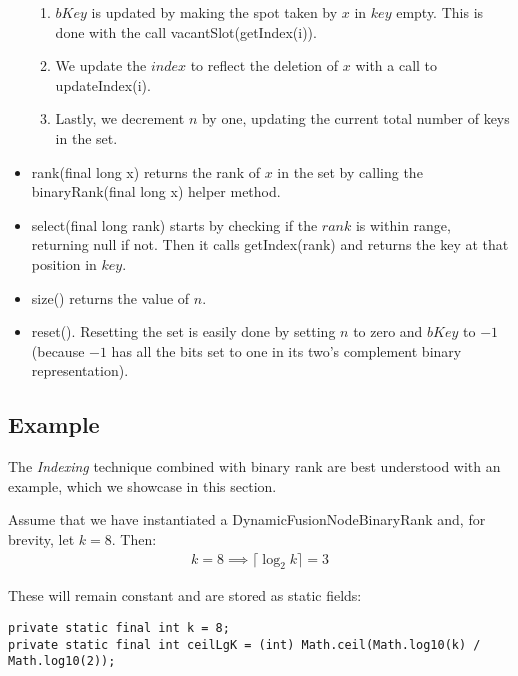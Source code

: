 \begin{itemize}
\begin{enumerate}
        \item
        $bKey$ is updated by making the spot taken by $x$ in $key$ empty. This is done with the call {\ttfamily vacantSlot(getIndex(i))}.
        
        \item
        We update the $index$ to reflect the deletion of $x$ with a call to {\ttfamily updateIndex(i)}.
        
        \item
        Lastly, we decrement $n$ by one, updating the current total number of keys in the set.
    \end{enumerate}
    
    \item
    {\ttfamily rank(final long x)} returns the rank of $x$ in the set by calling the {\ttfamily binaryRank(final long x)} helper method.
    
    \item
    {\ttfamily select(final long rank)} starts by checking if the $rank$ is within range, returning {\ttfamily null} if not. Then it calls {\ttfamily getIndex(rank)} and returns the key at that position in $key$.
    
    \item
    {\ttfamily size()} returns the value of $n$.
    
    \item
    {\ttfamily reset()}.
    Resetting the set is easily done by setting $n$ to zero and $bKey$ to $-1$ (because $-1$ has all the bits set to one in its two's complement binary representation).
\end{itemize}

\subsection{Example}

The \textit{Indexing} technique combined with binary rank are best understood with an example, which we showcase in this section.


Assume that we have instantiated a {\ttfamily DynamicFusionNodeBinaryRank} and, for brevity, let $k = 8$. Then:
\begin{align*}
    k = 8 \implies \lceil \log_2 k \rceil = 3
\end{align*}

These will remain constant and are stored as static fields:
\begin{lstlisting}
private static final int k = 8;
private static final int ceilLgK = (int) Math.ceil(Math.log10(k) / Math.log10(2));
\end{lstlisting}

